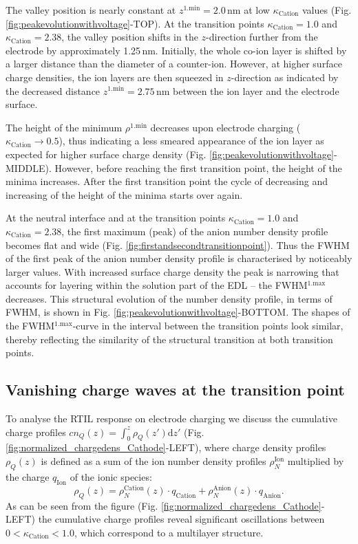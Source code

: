 \documentclass[final,5p,times,twocolumn]{elsarticle}
\begin{document}
The valley position is nearly constant at $z^\mathrm{1.min}=2.0\,\mathrm{nm}$ at low $\kappa_{\mathrm{Cation}}$ values (Fig. \ref{fig:peakevolutionwithvoltage}-TOP). At the transition points $\kappa_{\mathrm{Cation}}=1.0$ and $\kappa_{\mathrm{Cation}}=2.38$, the valley position shifts in the $z$-direction further from the electrode by approximately 1.25\,nm. Initially, the whole co-ion layer is shifted by a larger distance than the diameter of a counter-ion. However, at higher surface charge densities, the ion layers are then squeezed in $z$-direction as indicated by the decreased distance $z^\mathrm{1.min}=2.75\,\mathrm{nm}$ between the ion layer and the electrode surface. 

The height of the minimum $\rho^\mathrm{1.min}$ decreases upon electrode charging ($\kappa_{\mathrm{Cation}}\rightarrow0.5$), thus indicating a less smeared appearance of the ion layer as expected for higher surface charge density (Fig. \ref{fig:peakevolutionwithvoltage}-MIDDLE). However, before reaching the first transition point, the height of the minima increases. After the first transition point the cycle of decreasing and increasing of the height of the minima starts over again.

At the neutral interface and at the transition points $\kappa_{\mathrm{Cation}}=1.0$ and $\kappa_{\mathrm{Cation}}=2.38$, the first maximum (peak) of the anion number density profile becomes flat and wide (Fig. \ref{fig:firstandsecondtransitionpoint}). Thus the FWHM of the first peak of the anion number density profile is characterised by noticeably larger values. With increased surface charge density the peak is narrowing that accounts for layering within the solution part of the EDL -- the FWHM$^\mathrm{1.max}$ decreases. This structural evolution of the number density profile, in terms of FWHM, is shown in Fig. \ref{fig:peakevolutionwithvoltage}-BOTTOM. The shapes of the FWHM$^\mathrm{1.max}$-curve in the interval between the transition points look similar, thereby reflecting the similarity of the structural transition at both transition points.

\subsection{Vanishing charge waves at the transition point}

To analyse the RTIL response on electrode charging we discuss the cumulative charge profiles $cn_Q(z)=\int_0^z \rho_Q(z') \mathrm dz'$ (Fig. \ref{fig:normalized_chargedens_Cathode}-LEFT), where charge density profiles $\rho_Q(z)$ is defined as a sum of the ion number density profiles $\rho_N^\mathrm{Ion}$ multiplied by the charge $q_\mathrm{Ion}$ of the ionic species:
\[\rho_Q(z)=\rho_N^\mathrm{Cation}(z)\cdot q_\mathrm{Cation} + \rho_N^\mathrm{Anion}(z)\cdot q_\mathrm{Anion}.\]
As can be seen from the figure (Fig. \ref{fig:normalized_chargedens_Cathode}-LEFT) the cumulative charge profiles reveal significant oscillations between $0 < \kappa_{\mathrm{Cation}} < 1.0$, which correspond to a multilayer structure.
\end{document}
